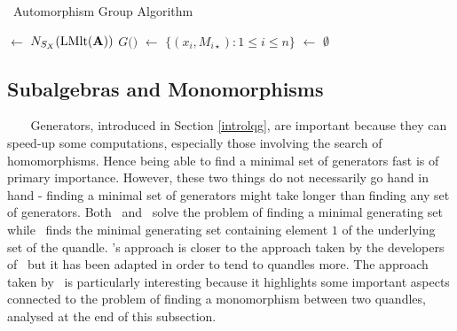 

\begin{algorithm}[H]\label{qrunauto}
\caption{\Software~Automorphism Group Algorithm}
\DontPrintSemicolon
{}
\BlankLine
\BlankLine
\Perms $\leftarrow$ $N_{S_X}(\operatorname{LMlt}(\mathbf{A}))$\;
$G($\Ls$)$ $\leftarrow$ $\{(x_i, M_{i\star}) : 1 \leq i \leq n\}$\;
\gens $\leftarrow$ $\emptyset$\;
\end{algorithm}



\subsection{Subalgebras and Monomorphisms}\textcolor{white}{line}
\newline \noindent Generators, introduced in Section \ref{introlqg}, are important because they can speed-up some computations, especially those involving the search of homomorphisms. Hence being able to find a minimal set of generators fast is of primary importance. However, these two things do not necessarily go hand in hand - finding a minimal set of generators might take longer than finding any set of generators. Both \rig~and \cream~solve the problem of finding a minimal generating set while \Software~finds the minimal generating set containing element $1$ of the underlying set of the quandle. \newline\newpage\noindent
\Software's approach is closer to the approach taken by the developers of \cream~but it has been adapted in order to tend to quandles more.
The approach taken by \cream~is particularly interesting because it highlights some important aspects connected to the problem of finding a monomorphism between two quandles, analysed at the end of this subsection.

